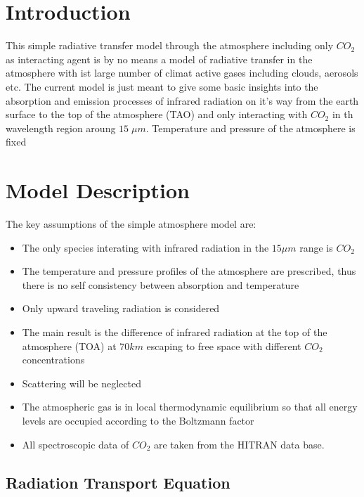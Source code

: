 \section{Introduction}

This simple radiative transfer model through the atmosphere including only $CO_2$ as interacting agent is by no means a model of radiative transfer in the atmosphere with ist large number of climat active gases including clouds, aerosols etc. The current model is just meant to give some basic insights into the absorption and emission processes of infrared radiation on it's way from the earth surface to the top of the atmosphere (TAO) and only interacting with $CO_2$ in th wavelength region aroung $15\; \mu m$. Temperature and pressure of the atmosphere is fixed

\section{Model Description}

The key assumptions of the simple atmosphere model are:
\begin{itemize}
	\item The only species interating with infrared radiation in the $15 \mu m$ range is $CO_2$
	\item The temperature and pressure profiles of the atmosphere are prescribed, thus there is no self consistency between absorption and temperature
	\item Only upward traveling radiation is considered
	\item The main result is the difference of infrared radiation at the top of the atmosphere (TOA) at $70 km$ escaping to free space with different $CO_2$ concentrations
	\item Scattering will be neglected
	\item The atmospheric gas is in local thermodynamic equilibrium so that all energy levels are occupied according to 
	the Boltzmann factor
	\item All spectroscopic data of $CO_2$ are taken from the HITRAN data base. 
\end{itemize}


\subsection{Radiation Transport Equation}

